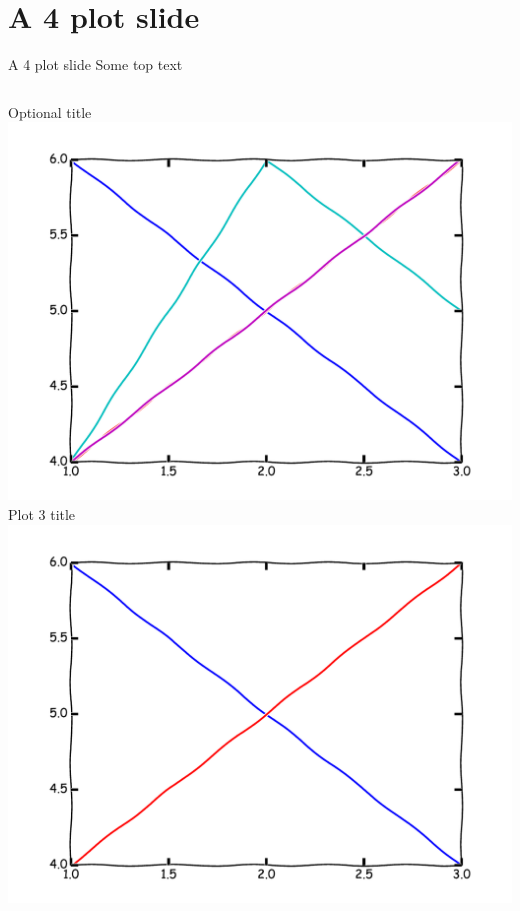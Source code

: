 \section{A 4 plot slide}
\begin{frame}{A 4 plot slide}
Some top text
\begin{columns}
\begin{column}{0.4\textwidth}
\begin{center}
Optional title
\\
\includegraphics[width=\textwidth]{example/plot1.pdf}
\\
Plot 3 title
\\
\includegraphics[width=\textwidth]{example/plot3.pdf}
\\
\end{center}
\end{column}


\end{columns}
\end{frame}
